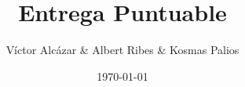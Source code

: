 
\author{Víctor Alcázar & Albert Ribes & Kosmas Palios}
\title{Entrega Puntuable}
\date{\today}

\maketitle
\tableofcontents










